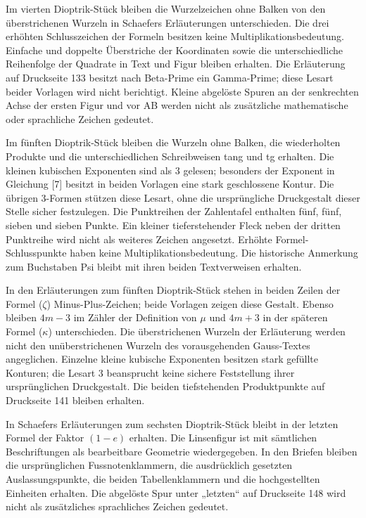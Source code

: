 Im vierten Dioptrik-Stück bleiben die Wurzelzeichen ohne Balken von den überstrichenen Wurzeln in Schaefers Erläuterungen unterschieden. Die drei erhöhten Schlusszeichen der Formeln besitzen keine Multiplikationsbedeutung. Einfache und doppelte Überstriche der Koordinaten sowie die unterschiedliche Reihenfolge der Quadrate in Text und Figur bleiben erhalten. Die Erläuterung auf Druckseite 133 besitzt nach Beta-Prime ein Gamma-Prime; diese Lesart beider Vorlagen wird nicht berichtigt. Kleine abgelöste Spuren an der senkrechten Achse der ersten Figur und vor AB werden nicht als zusätzliche mathematische oder sprachliche Zeichen gedeutet.

Im fünften Dioptrik-Stück bleiben die Wurzeln ohne Balken, die wiederholten Produkte und die unterschiedlichen Schreibweisen tang und tg erhalten. Die kleinen kubischen Exponenten sind als 3 gelesen; besonders der Exponent in Gleichung [7] besitzt in beiden Vorlagen eine stark geschlossene Kontur. Die übrigen 3-Formen stützen diese Lesart, ohne die ursprüngliche Druckgestalt dieser Stelle sicher festzulegen. Die Punktreihen der Zahlentafel enthalten fünf, fünf, sieben und sieben Punkte. Ein kleiner tieferstehender Fleck neben der dritten Punktreihe wird nicht als weiteres Zeichen angesetzt. Erhöhte Formel-Schlusspunkte haben keine Multiplikationsbedeutung. Die historische Anmerkung zum Buchstaben Psi bleibt mit ihren beiden Textverweisen erhalten.

In den Erläuterungen zum fünften Dioptrik-Stück stehen in beiden Zeilen der Formel ($\zeta$) Minus-Plus-Zeichen; beide Vorlagen zeigen diese Gestalt. Ebenso bleiben $4m-3$ im Zähler der Definition von $\mu$ und $4m+3$ in der späteren Formel ($\kappa$) unterschieden. Die überstrichenen Wurzeln der Erläuterung werden nicht den unüberstrichenen Wurzeln des vorausgehenden Gauss-Textes angeglichen. Einzelne kleine kubische Exponenten besitzen stark gefüllte Konturen; die Lesart 3 beansprucht keine sichere Feststellung ihrer ursprünglichen Druckgestalt. Die beiden tiefstehenden Produktpunkte auf Druckseite 141 bleiben erhalten.

In Schaefers Erläuterungen zum sechsten Dioptrik-Stück bleibt in der letzten Formel der Faktor $(1-e)$ erhalten. Die Linsenfigur ist mit sämtlichen Beschriftungen als bearbeitbare Geometrie wiedergegeben. In den Briefen bleiben die ursprünglichen Fussnotenklammern, die ausdrücklich gesetzten Auslassungspunkte, die beiden Tabellenklammern und die hochgestellten Einheiten erhalten. Die abgelöste Spur unter „letzten“ auf Druckseite 148 wird nicht als zusätzliches sprachliches Zeichen gedeutet.

